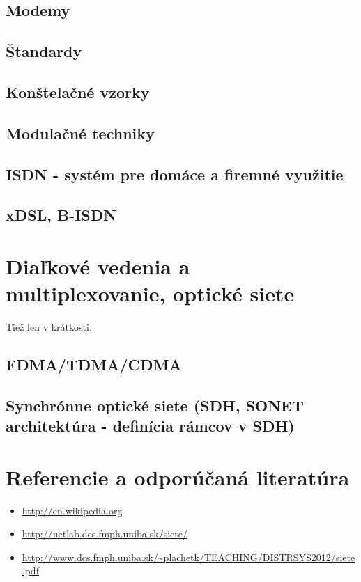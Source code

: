 \documentclass[10pt,a4paper]{article}
\begin{document}
\subsection{Modemy}      
\subsection{Štandardy}    
\subsection{Konštelačné vzorky}  
\subsection{Modulačné techniky}   
\subsection{ISDN - systém pre domáce a firemné využitie}  
\subsection{xDSL, B-ISDN}       



\section{Diaľkové vedenia a multiplexovanie, optické siete}
Tiež len v krátkosti. 

\subsection{FDMA/TDMA/CDMA}                           
\subsection{Synchrónne optické siete (SDH, SONET architektúra - definícia rámcov v SDH)}



\section{Referencie a odporúčaná literatúra}
\begin{itemize}                                
\item \url{http://en.wikipedia.org} 
\item \url{http://netlab.dcs.fmph.uniba.sk/siete/} 
\item \url{http://www.dcs.fmph.uniba.sk/\~plachetk/TEACHING/DISTRSYS2012/siete.pdf} 
\end{itemize}
\end{document}
